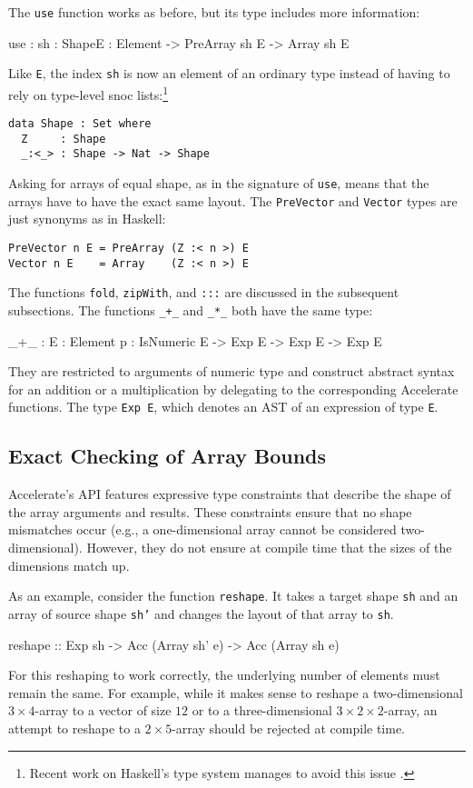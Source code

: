 \documentclass{llncs}
\begin{document}
The \texttt{use} function works as before, but its type
includes more information:
\begin{code}
use : {sh : Shape}{E : Element} -> PreArray sh E -> Array sh E
\end{code}
Like \texttt{E}, the index \texttt{sh} is now an element of an
ordinary type instead of having to rely on type-level snoc
lists:\footnote{Recent work on Haskell's type system manages to avoid
  this issue \cite{YorgeyWeirichCretinJonesVytiniotisMagalhaes2012}.}
\begin{verbatim}
data Shape : Set where
  Z     : Shape
  _:<_> : Shape -> Nat -> Shape
\end{verbatim}
Asking for arrays of equal shape, as in the signature of \texttt{use},
means that the arrays have to have the exact same layout. The
\texttt{PreVector} and \texttt{Vector} types are just synonyms as in
Haskell:
\begin{verbatim}
PreVector n E = PreArray (Z :< n >) E
Vector n E    = Array    (Z :< n >) E
\end{verbatim}
The functions \texttt{fold}, \texttt{zipWith}, and \texttt{:::} are
discussed in the subsequent subsections. The functions \verb|_+_| and
\verb|_*_| both have the same type:
\begin{code}
_+_ : {E : Element} {{p : IsNumeric E}} -> Exp E -> Exp E -> Exp E
\end{code}
They are restricted to arguments of numeric type and construct
abstract syntax for an addition or a multiplication by delegating to
the corresponding Accelerate functions. The type \texttt{Exp E},
which denotes an AST of an expression of type \texttt{E}.



\subsection{Exact Checking of Array Bounds}
\label{sec:exact-checking-array}

Accelerate's API features expressive type constraints that describe
the shape of the array arguments and results. These constraints ensure
that no shape mismatches occur (e.g., a one-dimensional array cannot be
considered two-dimensional). However, they do not ensure at compile
time that the sizes of the dimensions match up.

As an example, consider the function \texttt{reshape}. 
It takes a target shape \texttt{sh} and an array of source shape
\texttt{sh'} and changes the layout of that array to \texttt{sh}. 
\begin{hcode}
reshape :: Exp sh -> Acc (Array sh' e) -> Acc (Array sh e)
\end{hcode}
For this reshaping to work correctly, the underlying
number of elements must remain the same. For example, while it makes sense
to reshape a two-dimensional $3\times 4$-array to a vector of size
$12$ or to a three-dimensional $3\times2\times2$-array, an attempt to
reshape to a $2\times5$-array should be rejected at
compile time.
\end{document}
